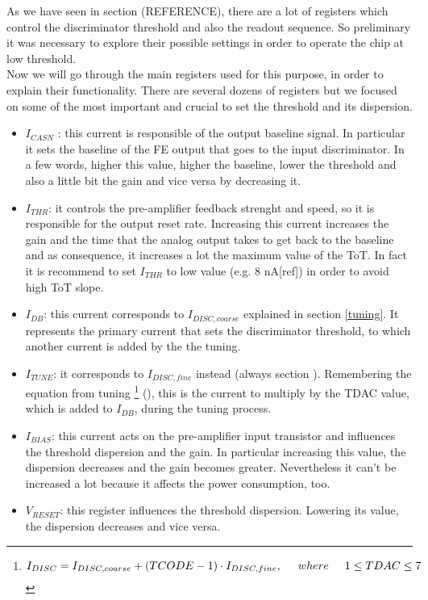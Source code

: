As we have seen in section (REFERENCE), there are a lot of registers which control the discriminator threshold and also the readout sequence. So preliminary it was necessary to explore their possible settings in order to operate the chip at low threshold.\\

Now we will go through the main registers used for this purpose, in order to explain their functionality. There are several dozens of registers but we focused on some of the most important and crucial to set the threshold and its dispersion.

\begin{itemize}
\label{currents}
\item \textit{$I_{CASN}$} : this current is responsible of the output baseline signal. In particular it sets the baseline of the FE output that goes to the input discriminator. In a few words, higher this value, higher the baseline, lower the threshold and also a little bit the gain and vice versa by decreasing it.
\item \textit{$I_{THR}$}: it controls the pre-amplifier feedback strenght and speed, so it is responsible for the output reset rate. Increasing this current increases the gain and the time that the analog output takes to get back to the baseline and as consequence, it increases a lot the maximum value of the ToT. In fact it is recommend to set $I_{THR}$ to low value (e.g. 8 nA[ref]) in order to avoid high ToT slope.
\item \textit{$I_{DB}$}: this current corresponds to \textbf{$I_{DISC,coarse}$} explained in section \vref{tuning}. It represents the primary current that sets the discriminator threshold, to which another current is added by the the tuning.
\item \textit{$I_{TUNE}$}: it corresponds to \textbf{$I_{DISC,fine}$} instead (always section ). Remembering the equation from tuning \footnote{
\begin{equation}
I_{DISC} = I_{DISC, coarse} + (TCODE - 1) \cdot I_{DISC,fine},  \hspace{.5cm}	where \hspace{.5cm} 1 \leq TDAC \leq 7
\end{equation}
} (), this is the current to multiply by the TDAC value, which is added to $I_{DB}$, during the tuning process.
\item \textit{$I_{BIAS}$}: this current acts on the pre-amplifier input transistor and influences the threshold dispersion and the gain. In particular increasing this value, the dispersion decreases and the gain becomes greater. Nevertheless it can't be increased a lot because it affects the power consumption, too. %
\item \textit{$V_{RESET}$}: this register influences the threshold dispersion. Lowering its value, the dispersion decreases and vice versa.
\end{itemize}

